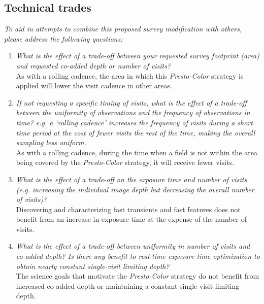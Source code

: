 \documentclass[12pt, letterpaper]{article}
\begin{document}
\subsection{Technical trades}
{\footnotesize {\it To aid in attempts to combine this proposed survey modification with others, please address the following questions:}}
\begin{enumerate}
    \item {\footnotesize {\it What is the effect of a trade-off between your requested survey footprint (area) and requested co-added depth or number of visits?}} \\ As with a rolling cadence, the area in which this {\em Presto-Color} strategy is applied will lower the visit cadence in other areas.
    \item {\footnotesize {\it If not requesting a specific timing of visits, what is the effect of a trade-off between the uniformity of observations and the frequency of observations in time? e.g. a `rolling cadence' increases the frequency of visits during a short time period at the cost of fewer visits the rest of the time, making the overall sampling less uniform.}} \\ As with a rolling cadence, during the time when a field is not within the area being covered by the {\em Presto-Color} strategy, it will receive fewer visits.
    \item {\footnotesize {\it What is the effect of a trade-off on the exposure time and number of visits (e.g. increasing the individual image depth but decreasing the overall number of visits)?}} \\ Discovering and characterizing fast transients and fast features does not benefit from an increase in exposure time at the expense of the number of visits. 
    \item {\footnotesize {\it What is the effect of a trade-off between uniformity in number of visits and co-added depth? Is there any benefit to real-time exposure time optimization to obtain nearly constant single-visit limiting depth?}} \\ The science goals that motivate the {\em Presto-Color} strategy do not benefit from increased co-added depth or maintaining a constant single-visit limiting depth.

\end{enumerate}
\end{document}

